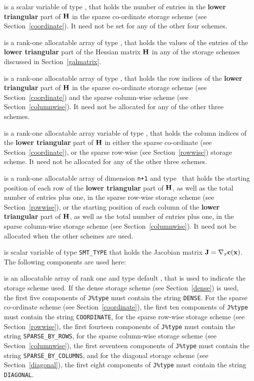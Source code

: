 \documentclass{galahad}
\begin{document}
\begin{description}
\begin{description}
 is a scalar variable of type \integer, that 
holds the number of entries in the {\bf lower triangular} part of ${\mathbf{H}}$
in the sparse co-ordinate storage scheme (see Section~\ref{coordinate}). 
It need not be set for any of the other four schemes.

 is a rank-one allocatable array of type \realdp, that holds
the values of the entries of the {\bf lower triangular} part
of the Hessian matrix ${\mathbf{H}}$ in any of the 
storage schemes discussed in Section~\ref{galmatrix}.

 is a rank-one allocatable array of type \integer,
that holds the row indices of the {\bf lower triangular} part of ${\mathbf{H}}$ 
in the sparse co-ordinate storage
scheme (see Section~\ref{coordinate}) and the sparse column-wise
scheme (see Section~\ref{columnwise}). 
It need not be allocated for any of the other three schemes.

 is a rank-one allocatable array variable of type \integer,
that holds the column indices of the {\bf lower triangular} part of 
${\mathbf{H}}$ in either the sparse co-ordinate 
(see Section~\ref{coordinate}), or the sparse row-wise 
(see Section~\ref{rowwise}) storage scheme.
It need not be allocated for any of the other three schemes.

 is a rank-one allocatable array of dimension {\tt n+1} and type 
\integer\ that holds the starting position of 
each row of the {\bf lower triangular} part of ${\mathbf{H}}$, as well
as the total number of entries plus one, in the sparse row-wise storage
scheme (see Section~\ref{rowwise}), or the starting position of 
each column of the {\bf lower triangular} part of ${\mathbf{H}}$, as well
as the total number of entries plus one, in the sparse column-wise storage
scheme (see Section~\ref{columnwise}).
It need not be allocated when the other schemes are used.

\end{description}

 is scalar variable of type {\tt SMT\_TYPE} 
that holds the Jacobian matrix ${\mathbf{J}}=\nabla_x{\mathbf{c}}({\mathbf{x}})$. The following components
are used here:

\begin{description}

 is an allocatable array of rank one and type default 
\character, that
is used to indicate the storage scheme used. If the dense storage scheme 
(see Section~\ref{dense}) is used, 
the first five components of {\tt J\%type} must contain the
string {\tt DENSE}.
For the sparse co-ordinate scheme (see Section~\ref{coordinate}), 
the first ten components of {\tt J\%type} must contain the
string {\tt COORDINATE},  
for the sparse row-wise storage scheme (see Section~\ref{rowwise}),
the first fourteen components of {\tt J\%type} must contain the
string {\tt SPARSE\_BY\_ROWS},
for the sparse column-wise storage scheme (see Section~\ref{columnwise}),
the first seventeen components of {\tt J\%type} must contain the
string {\tt SPARSE\_BY\_COLUMNS},
and for the diagonal storage scheme (see Section~\ref{diagonal}),
the first eight components of {\tt J\%type} must contain the
string {\tt DIAGONAL}.


\end{description}
\end{description}
\end{document}
